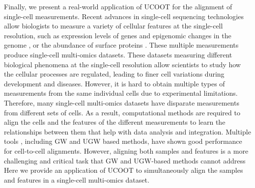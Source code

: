 Finally, we present a real-world application of UCOOT for the alignment of single-cell measurements.
Recent advances in single-cell sequencing technologies allow biologists to measure
a variety of cellular features at the single-cell resolution, such as expression levels of genes
and epigenomic changes in the genome \citep{Buenrostro15,Chen19},
or the abundance of surface proteins \citep{CITEseq}. These multiple measurements produce
single-cell multi-omics datasets. These datasets measuring different biological phenomena
at the single-cell resolution allow scientists to study how the cellular processes are regulated,
leading to finer cell variations during development and diseases. However, it is hard to obtain
multiple types of measurements from the same individual cells due to experimental limitations.
Therefore, many single-cell multi-omics datasets have disparate measurements from different
sets of cells. As a result, computational methods are required to align the cells and
the features of the different measurements to learn the relationships between them that help
with data analysis and integration. Multiple tools \citep{Pamona, Seurat, Liu2019},
including GW \citep{Pamona, Demetci22} and UGW \citep{Demetci22-2} based methods,
have shown good performance for cell-to-cell alignments.
However, aligning both samples and features is a more challenging and critical task that
GW and UGW-based methods cannot address
Here we provide an application of UCOOT to simultaneously align the samples and features
in a single-cell multi-omics dataset.
%
%

